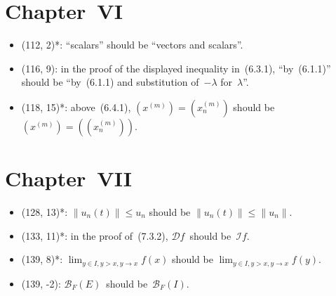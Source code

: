\documentclass[letterpaper,12pt]{article}
\newcommand{\B}{\mathcal{B}}
\renewcommand{\Im}{\mathcal{I}}
\newcommand{\norm}[1]{\lVert{#1}\rVert}
\begin{document}
\section*{Chapter~VI}
\begin{itemize}
\item (112, 2)*: ``scalars'' should be ``vectors and scalars''.
\item (116, 9): in the proof of the displayed inequality in~(6.3.1), ``by~(6.1.1)'' should be ``by~(6.1.1) and substitution of~\(-\lambda\) for~\(\lambda\)''.
\item (118, 15)*: above~(6.4.1), \((x^{(m)})=(x^{(m)}_n)\) should be \((x^{(m)})=((x^{(m)}_n))\).
\end{itemize}

\section*{Chapter~VII}
\begin{itemize}
\item (128, 13)*: \(\norm{u_n(t)}\le u_n\) should be \(\norm{u_n(t)}\le\norm{u_n}\).
\item (133, 11)*: in the proof of~(7.3.2), \(\mathcal{D}f\)~should be~\(\Im f\).
\item (139, 8)*: \(\lim_{y\in I,y>x,y\to x}f(x)\) should be \(\lim_{y\in I,y>x,y\to x}f(y)\).
\item (139, -2): \(\B_F(E)\)~should be~\(\B_F(I)\).
\end{itemize}
\end{document}
